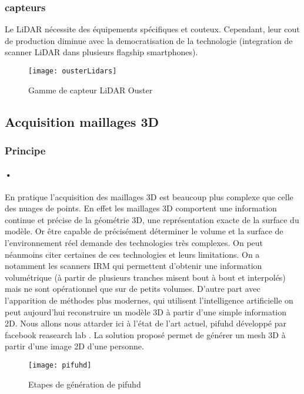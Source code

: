 \subsubsection{capteurs}
Le LiDAR nécessite des équipements spécifiques et couteux. Cependant, leur cout de production diminue avec la democratisation de la technologie (integration de scanner LiDAR dans plusieurs flagship smartphones).
\begin{figure}[h]
    \centering
    \texttt{[image: ousterLidars]}
    \caption{Gamme de capteur LiDAR Ouster}
    \label{fig:ousterLidars}
\end{figure}
\FloatBarrier


\subsection{Acquisition maillages 3D}
\subsubsection{Principe}
\paragraph{•} En pratique l'acquisition des maillages 3D est beaucoup plus complexe que celle des nuages de points. En effet les maillages 3D comportent une information continue et précise de la géométrie 3D, une représentation exacte de la surface du modèle. Or être capable de précisément déterminer le volume et la surface de l’environnement réel demande des technologies très complexes.
On peut néanmoins citer certaines de ces technologies et leurs limitations. On a notamment les scanners IRM qui permettent d'obtenir une information volumétrique (à partir de plusieurs tranches misent bout à bout et interpolés) mais ne sont opérationnel que sur de petits volumes.
\newline
D'autre part avec l’apparition de méthodes plus modernes, qui utilisent l'intelligence artificielle on peut aujourd’hui reconstruire un modèle 3D à partir d'une simple information 2D. Nous allons nous attarder ici à l'état de l'art actuel, pifuhd développé par facebook reasearch lab \cite{saito2020pifuhd}.
La solution proposé permet de générer un mesh 3D à partir d'une image 2D d'une personne.

\begin{figure}[h]
    \centering
    \texttt{[image: pifuhd]}
    \caption{Etapes de génération de pifuhd}
    \label{fig:pifuhd}
\end{figure}
\FloatBarrier

